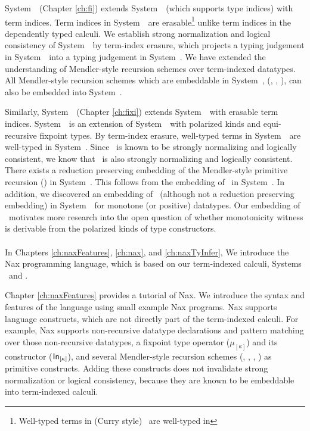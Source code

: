 System~\Fi\ (Chapter \ref{ch:fi}) extends System~\Fw\ (which supports
type indices) with term indices. Term indices in System~\Fi\ are 
erasable\footnote{Well-typed terms in (Curry style) \Fi\ are well-typed in \Fw} unlike term indices in the dependently typed calculi. We establish
strong normalization and logical consistency of System~\Fi\ by
term-index erasure, which projects a typing judgement in System~\Fi\ into
a typing judgement in System~\Fw. We have extended the understanding of
Mendler-style recursion schemes over term-indexed datatypes. All
Mendler-style recursion schemes which are embeddable in System~\Fw,
(\eg, \MIt, \MsfIt), can also be embedded into System~\Fi.

Similarly, System~\Fixi\ (Chapter \ref{ch:fixi}) extends System~\Fixw\ with
erasable term indices. System~\Fixw\ is an extension of System~\Fw\ with
polarized kinds and equi-recursive fixpoint types. By term-index erasure,
well-typed terms in System~\Fixi\ are well-typed in System~\Fixw.
Since \Fixw\ is known to be strongly normalizing and logically consistent,
we know that \Fixi\ is also strongly normalizing and logically consistent.
There exists a reduction preserving embedding of the Mendler-style
primitive recursion (\MPr) in System~\Fixi. This follows from
the embedding of \MPr\ in System~\Fixw. In addition, we discovered
an embedding of \McvPr\ (although not a reduction preserving embedding)
in System~\Fixi\ for monotone (or positive) datatypes. Our embedding of
\McvPr\ motivates more research into the open question of whether
monotonicity witness is derivable from the polarized kinds of type constructors.

\paragraph{}
In Chapters \ref{ch:naxFeatures}, \ref{ch:nax}, and \ref{ch:naxTyInfer},
We introduce the Nax programming language, which is based on
our term-indexed calculi, Systems \Fi\ and \Fixi.

Chapter \ref{ch:naxFeatures} provides a tutorial of Nax.
We introduce the syntax and features of the language
using small example Nax programs. Nax supports language constructs,
which are not directly part of the term-indexed calculi.
For example, Nax supports non-recursive datatype declarations and
pattern matching over those non-recursive datatypes,
a fixpoint type operator ($\mu_{[\kappa]}$) and
its constructor ($\mathsf{In}_{[\kappa]}$), and
several Mendler-style recursion schemes (\MIt, \MPr, \McvPr, \MsfIt)
as primitive constructs. Adding these constructs does not invalidate
strong normalization or logical consistency, because they are known to
be embeddable into term-indexed calculi.

